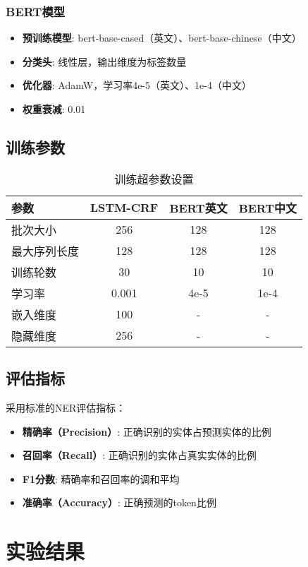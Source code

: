 \documentclass{article}
\begin{document}
\subsubsection{BERT模型}
\begin{itemize}
    \item \textbf{预训练模型}: bert-base-cased（英文）、bert-base-chinese（中文）
    \item \textbf{分类头}: 线性层，输出维度为标签数量
    \item \textbf{优化器}: AdamW，学习率4e-5（英文）、1e-4（中文）
    \item \textbf{权重衰减}: 0.01
\end{itemize}

\subsection{训练参数}

\begin{table}[H]
\centering
\caption{训练超参数设置}
\begin{tabular}{lccc}
\toprule
参数 & LSTM-CRF & BERT英文 & BERT中文 \\
\midrule
批次大小 & 256 & 128 & 128 \\
最大序列长度 & 128 & 128 & 128 \\
训练轮数 & 30 & 10 & 10 \\
学习率 & 0.001 & 4e-5 & 1e-4 \\
嵌入维度 & 100 & - & - \\
隐藏维度 & 256 & - & - \\
\bottomrule
\end{tabular}
\end{table}

\subsection{评估指标}

采用标准的NER评估指标：
\begin{itemize}
    \item \textbf{精确率（Precision）}: 正确识别的实体占预测实体的比例
    \item \textbf{召回率（Recall）}: 正确识别的实体占真实实体的比例
    \item \textbf{F1分数}: 精确率和召回率的调和平均
    \item \textbf{准确率（Accuracy）}: 正确预测的token比例
\end{itemize}

\section{实验结果}
\end{document}
